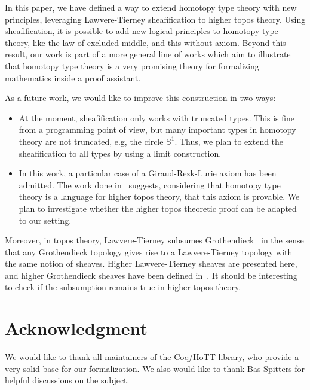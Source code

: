 \documentclass[conference]{IEEEtran}
\newcommand{\eg}{e.g,\xspace}
\begin{document}
In this paper, we have defined a way to extend homotopy type theory
with new principles, leveraging Lawvere-Tierney sheafification to
higher topos theory. 
%
Using sheafification, it is possible to add new logical principles to
homotopy type theory, like the law of excluded middle, and this
without axiom.
%
Beyond this result, our work is part of a more general line of works
which aim to illustrate that homotopy type theory is a very promising
theory for formalizing mathematics inside a proof assistant.


As a future work, we would like to improve this construction in two
ways:
\begin{itemize}
\item 
  At the moment, sheafification only works with truncated
  types. This is fine from a programming point of view, 
  but many important types in homotopy theory are not
  truncated, \eg the circle $\mathbb S^1$.  Thus, we plan to extend
  the sheafification to all types by using a
  limit construction.
\item 
  In this work, a particular case of a Giraud-Rezk-Lurie axiom has
  been admitted. The work done in~\cite[Chapter 6]{lurie} suggests,
  considering that homotopy type theory is a language for higher topos
  theory, that this axiom is provable. We plan to investigate whether the
  higher topos theoretic proof can be adapted to our setting.
\end{itemize}
Moreover, in topos theory, Lawvere-Tierney subsumes Grothendieck~\cite[Section~V.4]{maclanemoerdijk} in the sense that any
Grothendieck topology gives rise to a Lawvere-Tierney topology with
the same notion of sheaves. Higher Lawvere-Tierney sheaves are
presented here, and higher Grothendieck sheaves have been defined
in~\cite{lurie}. It should be interesting to check if the subsumption
remains true in higher topos theory.







\section*{Acknowledgment}

We would like to thank all maintainers of the Coq/HoTT library, who
provide a very solid base for our formalization. We also would like
to thank Bas Spitters for helpful discussions on the subject.
\end{document}
